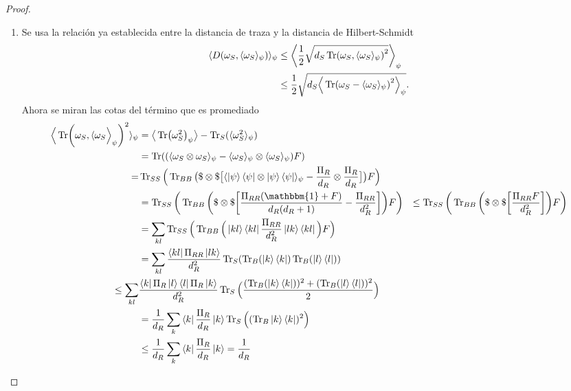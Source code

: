 \begin{proof}
\begin{enumerate}
\item Se usa la relación ya establecida entre la distancia de traza y la distancia de Hilbert-Schmidt
\begin{align*}\label{a12}
\langle D(\omega_{S}, \langle \omega_{S} \rangle_{\psi}) \rangle_{\psi} &\leq \bigg \langle \frac{1}{2} \sqrt{d_{S} \Tr (\omega_{S}, \langle \omega_{S} \rangle_{\psi})^{2}} \bigg \rangle_{\psi}\\
&\leq \frac{1}{2} \sqrt{d_{S} \Big \langle \Tr (\omega_{S} - \langle \omega_{S} \rangle_{\psi})^{2} \Big \rangle_{\psi}}.
\end{align*}
Ahora se miran las cotas del término que es promediado
\begin{align*}
\Big \langle \Tr (\omega_{S}, \langle \omega_{S} \Big \rangle_{\psi})^{2} \rangle_{\psi}  &= \big \langle \Tr(\omega_{S}^{2})_{\psi} \big \rangle - \Tr_{S} (\langle \omega_{S}^{2} \rangle_{\psi})\\
&=\Tr (   (\langle \omega_{S} \otimes \omega_{S} \rangle_{\psi} - \langle \omega_{S} \rangle_{\psi} \otimes \langle \omega_{S} \rangle_{\psi} )F )\\
= &\Tr_{SS} \Big( \Tr_{BB} \big( \$ \otimes \$ \big[ \langle \ket{\psi}\bra{\psi} \otimes  \ket{\psi}\bra{\psi}\rangle_{\psi} - \frac{\Pi_{R}}{d_{R}} \otimes  \frac{\Pi_{R}}{d_{R}}  \big]  \big) F \Big)\\
&= \Tr_{SS} \bigg( \Tr_{BB} \bigg( \$ \otimes \$ \bigg[ \frac{\Pi_{RR}(\mathbbm{1}+F)}{d_{R}(d_{R}+1)} - \frac{\Pi_{RR}}{d_{R}^{2}}  \bigg]  \bigg) F \bigg)
&\leq \Tr_{SS} \bigg(  \Tr_{BB} \bigg( \$ \otimes \$ \bigg[ \frac{\Pi_{RR}F}{d_{R}^{2}} \bigg] \bigg) F \bigg)\\
&= \sum_{kl}  \Tr_{SS} \Big(  \Tr_{BB} \Big( \ket{kl}\bra{kl} \frac{\Pi_{RR}}{d_{R}^{2}}  \ket{lk}\bra{kl} \Big) F \Big)\\
&= \sum_{kl} \frac{\bra{kl}\Pi_{RR}\ket{lk}}{d_{R}^{2}} \Tr_{S}(\Tr_{B}(\ket{k}\bra{k}) \Tr_{B}(\ket{l}\bra{l}) )\\
\leq \sum_{kl} &\frac{\bra{k}\Pi_{R}\ket{l}\bra{l}\Pi_{R}\ket{k}}{d_{R}^{2}} \Tr_{S} \Big( \frac{(\Tr_{B}(\ket{k}\bra{k}))^{2}+(\Tr_{B}(\ket{l}\bra{l}))^{2}}{2} \Big)\\
&=\frac{1}{d_{R}} \sum_{k} \bra{k} \frac{\Pi_{R}}{d_{R}} \ket{k} \Tr_{S} \Big( (\Tr_{B} \ket{k}\bra{k})^{2} \Big)\\
&\leq \frac{1}{d_{R}} \sum_{k} \bra{k} \frac{\Pi_{R}}{d_{R}} \ket{k} = \frac{1}{d_{R}}
\end{align*}

\end{enumerate}
\end{proof}
